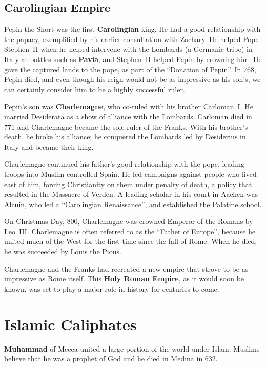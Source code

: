 \subsection*{Carolingian Empire}

Pepin the Short was the first \textbf{Carolingian} king.
He had a good relationship with the papacy, exemplified by his earlier consultation with Zachary.
He helped Pope Stephen~II when he helped intervene with the Lombards (a Germanic tribe)
in Italy at battles such as \textbf{Pavia}, and Stephen~II helped Pepin by crowning him.
He gave the captured lands to the pope, as part of the ``Donation of Pepin''.
In 768, Pepin died, and even though his reign would not be as impressive as his son's,
we can certainly consider him to be a highly successful ruler.

Pepin's son was \textbf{Charlemagne}, who co-ruled with his brother Carloman~I.
He married Desiderata as a show of alliance with the Lombards.
Carloman died in 771 and Charlemagne became the sole ruler of the Franks.
With his brother's death, he broke his alliance;
he conquered the Lombards led by Desiderius in Italy and became their king.

Charlemagne continued his father's good relationship with the pope,
leading troops into Muslim controlled Spain.
He led campaigns against people who lived east of him,
forcing Christianity on them under penalty of death,
a policy that resulted in the Massacre of Verden.
A leading scholar in his court in Aachen was Alcuin,
who led a ``Carolingian Renaissance'', and established the Palatine school.

On Christmas Day, 800, Charlemagne was crowned Emperor of the Romans by Leo~III\@.
Charlemagne is often referred to as the ``Father of Europe'',
because he united much of the West for the first time since the fall of Rome.
When he died, he was succeeded by Louis the Pious.

Charlemagne and the Franks had recreated a new empire
that strove to be as impressive as Rome itself.
This \textbf{Holy Roman Empire}, as it would soon be known,
was set to play a major role in history for centuries to come.

\section{Islamic Caliphates}

\textbf{Muhammad} of Mecca united a large portion of the world under Islam.
Muslims believe that he was a prophet of God and he died in Medina in 632.

